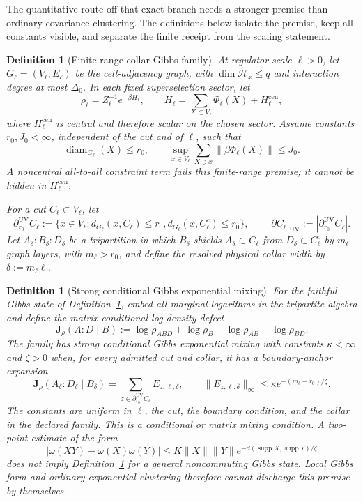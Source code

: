 \documentclass[11pt]{article}
\newtheorem{definition}[theorem]{Definition}
\begin{document}
The quantitative route off that exact branch needs a stronger premise than ordinary covariance
clustering. The definitions below isolate the premise, keep all constants visible, and separate the
finite receipt from the scaling statement.

\begin{definition}[Finite-range collar Gibbs family]\label{def:finite-range-collar-gibbs}
At regulator scale \(\ell>0\), let \(G_\ell=(V_\ell,E_\ell)\) be the cell-adjacency graph,
with \(\dim\mathcal H_x\le q\) and interaction degree at most \(\Delta_0\). In each fixed
superselection sector, let
\[
 \rho_\ell=Z_\ell^{-1}e^{-\beta H_\ell},
 \qquad
 H_\ell=\sum_{X\subset V_\ell}\Phi_\ell(X)+H_\ell^{\mathrm{cen}},
\]
where \(H_\ell^{\mathrm{cen}}\) is central and therefore scalar on the chosen sector. Assume
constants \(r_0,J_0<\infty\), independent of the cut and of \(\ell\), such that
\[
 \operatorname{diam}_{G_\ell}(X)\le r_0,
 \qquad
 \sup_{x\in V_\ell}\sum_{X\ni x}\|\beta\Phi_\ell(X)\|\le J_0.
\]
A noncentral all-to-all constraint term fails this finite-range premise; it cannot be hidden in
\(H_\ell^{\mathrm{cen}}\).

For a cut \(C_\ell\subset V_\ell\), let
\[
 \partial_{r_0}^{\mathrm{UV}}C_\ell
 :=\{x\in V_\ell:
 d_{G_\ell}(x,C_\ell)\le r_0,
 d_{G_\ell}(x,C_\ell^c)\le r_0\},
 \qquad
 |\partial C_\ell|_{\mathrm{UV}}
 :=|\partial_{r_0}^{\mathrm{UV}}C_\ell|.
\]
Let \(A_\delta:B_\delta:D_\delta\) be a tripartition in which \(B_\delta\) shields
\(A_\delta\subset C_\ell\) from \(D_\delta\subset C_\ell^c\) by
\(m_\ell\) graph layers, with \(m_\ell>r_0\), and define the resolved physical
collar width by \(\delta:=m_\ell\ell\).
\end{definition}

\begin{definition}[Strong conditional Gibbs exponential mixing]\label{def:strong-conditional-gibbs-mixing}
For the faithful Gibbs state of Definition~\ref{def:finite-range-collar-gibbs}, embed all marginal
logarithms in the tripartite algebra and define the matrix conditional log-density defect
\[
 \mathbf J_\rho(A:D\mid B)
 :=
 \log\rho_{ABD}+\log\rho_B-\log\rho_{AB}-\log\rho_{BD}.
\]
The family has strong conditional Gibbs exponential mixing with constants
\(\kappa<\infty\) and \(\zeta>0\) when, for every admitted cut and collar, it has a boundary-anchor
expansion
\[
 \mathbf J_\rho(A_\delta:D_\delta\mid B_\delta)
 =\sum_{z\in\partial_{r_0}^{\mathrm{UV}}C_\ell}E_{z,\ell,\delta},
 \qquad
 \|E_{z,\ell,\delta}\|_\infty
 \le
 \kappa e^{-(m_\ell-r_0)/\zeta}.
\]
The constants are uniform in \(\ell\), the cut, the boundary condition, and the collar in the
declared family. This is a conditional or matrix mixing condition. A two-point estimate of the
form
\[
 |\omega(XY)-\omega(X)\omega(Y)|
 \le K\|X\|\|Y\|e^{-d(\operatorname{supp}X,\operatorname{supp}Y)/\zeta}
\]
does not imply Definition~\ref{def:strong-conditional-gibbs-mixing} for a general noncommuting
Gibbs state. Local Gibbs form and ordinary exponential clustering therefore cannot discharge this
premise by themselves.
\end{definition}
\end{document}
